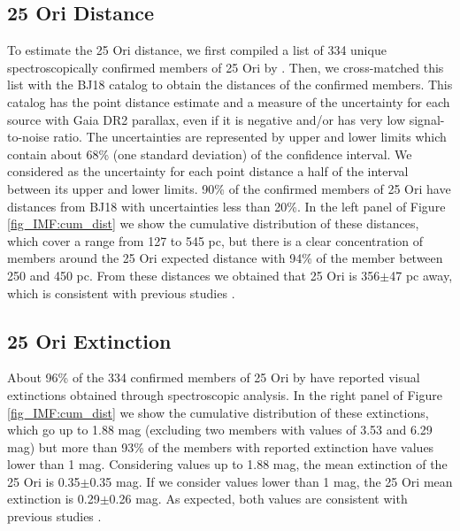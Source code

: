 \documentclass[12pt]{article}
\begin{document}
\subsection{25 Ori Distance}
\label{sec_app_IMF:distance}
To estimate the 25 Ori distance, we first compiled a list of 334 unique spectroscopically confirmed members of 25 Ori by \citet{Briceno2005,Briceno2007,Downes2014,Downes2015,Suarez2017,Briceno2018}. Then, we cross-matched this list with the BJ18 catalog to obtain the distances of the confirmed members. This catalog has the point distance estimate and a measure of the uncertainty for each source with Gaia DR2 parallax, even if it is negative and/or has very low signal-to-noise ratio. The uncertainties are represented by upper and lower limits which contain about 68\% (one standard deviation) of the confidence interval. We considered as the uncertainty for each point distance a half of the interval between its upper and lower limits. 90\% of the confirmed members of 25 Ori have distances from BJ18 with uncertainties less than 20\%. In the left panel of Figure \ref{fig_IMF:cum_dist} we show the cumulative distribution of these distances, which cover a range from 127 to 545 pc, but there is a clear concentration of members around the 25 Ori expected distance with 94\% of the member between 250 and 450 pc. From these distances we obtained that 25 Ori is 356$\pm$47 pc away, which is consistent with previous studies \citep{Briceno2007,Downes2014,Suarez2017,Briceno2018,Kounkel2018}.

\subsection{25 Ori Extinction}
\label{sec_app_IMF:extinction}
About 96\% of the 334 confirmed members of 25 Ori by \citet{Briceno2005,Briceno2007,Downes2014,Downes2015,Suarez2017,Briceno2018} have reported visual extinctions obtained through spectroscopic analysis. In the right panel of Figure \ref{fig_IMF:cum_dist} we show the cumulative distribution of these extinctions, which go up to 1.88 mag (excluding two members with values of 3.53 and 6.29 mag) but more than 93\% of the members with reported extinction have values lower than 1 mag. Considering values up to 1.88 mag, the mean extinction of the 25 Ori is 0.35$\pm$0.35 mag. If we consider values lower than 1 mag, the 25 Ori mean extinction is 0.29$\pm$0.26 mag. As expected, both values are consistent with previous studies \citep{Kharchenko2005,Briceno2005,Briceno2007,Downes2014,Suarez2017,Briceno2018}. 
\end{document}
